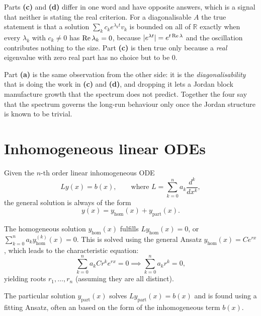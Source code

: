 \begin{exercisesolution}
\begin{remark}
Parts \textbf{(c)} and \textbf{(d)} differ in one word and have opposite answers, which is a
signal that neither is stating the real criterion. For a diagonalisable $A$ the true statement is
that a solution $\sum_k c_k e^{\lambda_k t}v_k$ is bounded on all of $\mathbb{R}$ exactly when
every $\lambda_k$ with $c_k \neq 0$ has $\operatorname{Re}\lambda_k = 0$, because
$\lvert e^{\lambda t}\rvert = e^{t\operatorname{Re}\lambda}$ and the oscillation contributes nothing to the
size. Part \textbf{(c)} is then true only because a \emph{real} eigenvalue with zero real part
has no choice but to be $0$.

Part \textbf{(a)} is the same observation from the other side: it is the \emph{diagonalisability}
that is doing the work in \textbf{(c)} and \textbf{(d)}, and dropping it lets a Jordan block
manufacture growth that the spectrum does not predict. Together the four say that the spectrum
governs the long-run behaviour only once the Jordan structure is known to be trivial.
\end{remark}
\end{exercisesolution}

\section{Inhomogeneous linear ODEs}
\label{sec:inhomogeneous_odes}

Given the $n$-th order linear inhomogeneous ODE
\[Ly(x) = b(x), \qquad \text{where } L = \sum_{k=0}^n a_k \frac{d^k}{dx^k},\]
the general solution is always of the form
\[y(x) = y_{\text{hom}}(x) + y_{\text{part}}(x).\]

The homogeneous solution $y_{\text{hom}}(x)$ fulfills $Ly_{\text{hom}}(x) = 0$, or $\sum_{k=0}^n a_k y_{\text{hom}}^{(k)}(x) = 0$. This is solved using the general Ansatz $y_{\text{hom}}(x) = C e^{rx}$, which leads to the characteristic equation:
\[\sum_{k=0}^n a_k C r^k e^{rx} = 0 \implies \sum_{k=0}^n a_k r^k = 0,\]
yielding roots $r_1, \dots, r_n$ (assuming they are all distinct).

The particular solution $y_{\text{part}}(x)$ solves $Ly_{\text{part}}(x) = b(x)$ and is found using a fitting Ansatz, often an  based on the form of the inhomogeneous term $b(x)$.

